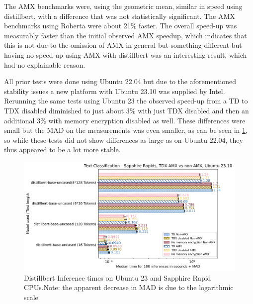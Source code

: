 The AMX benchmarks were, using the geometric mean, similar in speed using distillbert, with a difference that was not statistically significant. The AMX benchmarks using Roberta were about 21\% faster. The overall speed-up was measurably faster than the initial observed AMX speedup, which indicates that this is not due to the omission of AMX in general but something different but having no speed-up using AMX with distillbert was an interesting result, which had no explainable reason. 


All prior tests were done using Ubuntu 22.04 but due to the aforementioned stability issues a new platform with Ubuntu 23.10 was supplied by Intel. Rerunning the same tests using Ubuntu 23 the observed speed-up from a TD to TDX disabled diminished to just about 3\% with just TDX disabled and then an additional 3\% with memory encryption disabled as well. These differences were small but the MAD on the measurements was even smaller, as can be seen in  \cref{fig:distillbertAMXUbuntu23}, so while these tests did not show differences as large as on Ubuntu 22.04, they thus appeared to be a lot more stable. 
\begin{figure}
   \centering
       \includegraphics[width=.95\textwidth]{figures/inferencedistillbertMADUbuntu23AMX.png} 
 \caption{Distillbert Inference times on Ubuntu 23 and Sapphire Rapid CPUs.Note: the apparent decrease in MAD is due to the logarithmic scale}
 \label{fig:distillbertAMXUbuntu23}
\end{figure}

